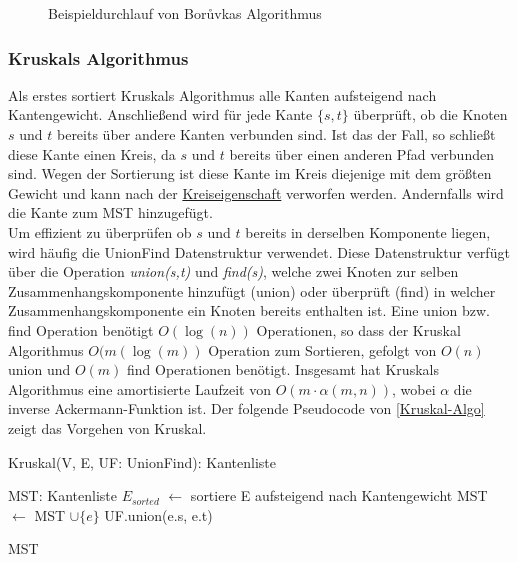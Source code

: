 \begin{figure}[H]
    \centering
    
    \caption{Beispieldurchlauf von Bor{\r u}vkas Algorithmus}
    \label{Boruvka-Img}
\end{figure}


\subsubsection{Kruskals Algorithmus}
Als erstes sortiert Kruskals Algorithmus
alle Kanten aufsteigend nach Kantengewicht. Anschließend wird für jede Kante $\{s,t\}$ überprüft, ob die Knoten $s$ und $t$ bereits über andere Kanten verbunden sind. Ist das der Fall, so schließt diese Kante einen Kreis, da $s$ und $t$ bereits über einen anderen Pfad verbunden sind. Wegen der Sortierung ist diese Kante im Kreis diejenige mit dem größten Gewicht und kann nach der \hyperref[Kreiseigenschaft]{Kreiseigenschaft} verworfen werden.
Andernfalls wird die Kante zum MST hinzugefügt.\\
Um effizient zu überprüfen ob $s$ und $t$ bereits in derselben Komponente liegen, wird häufig die UnionFind Datenstruktur verwendet. Diese Datenstruktur verfügt über die Operation \emph{union(s,t)} und \emph{find(s)}, welche zwei Knoten zur selben Zusammenhangskomponente hinzufügt (union) oder überprüft (find) in welcher Zusammenhangskomponente ein Knoten bereits enthalten ist. Eine union bzw. find Operation benötigt $O(\log(n))$ Operationen, so dass der Kruskal Algorithmus $O(m(\log(m))$ Operation zum Sortieren, gefolgt von $O(n)$ union und $O(m)$ find Operationen benötigt.
Insgesamt hat Kruskals Algorithmus eine amortisierte Laufzeit von $O(m \cdot \alpha(m,n))$, wobei $\alpha$ die inverse Ackermann-Funktion ist.
Der folgende Pseudocode von \cref{Kruskal-Algo} zeigt das Vorgehen von Kruskal.

\begin{algorithm} 
\caption{Kruskal(V, E, UF: UnionFind): Kantenliste}
\begin{algorithmic}[1]
\label{Kruskal-Algo}

\STATE MST: Kantenliste
\STATE $E_{sorted}$ $\gets$ sortiere E aufsteigend nach Kantengewicht
        \STATE MST $\gets$ MST $\cup \{e\}$ 
        \STATE UF.union(e.s, e.t)
    \ENDIF
\ENDFOR

\RETURN MST

\end{algorithmic}
\end{algorithm}

